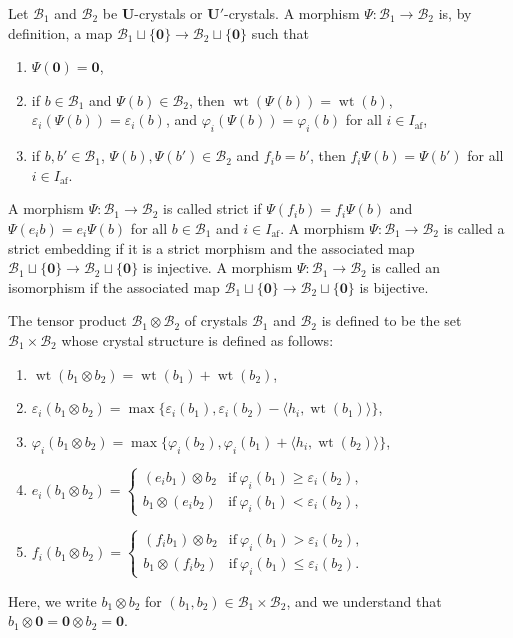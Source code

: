 \documentclass[ALCO,ThmDefs,Unicode,epreuves]{cedram}
\newcommand\bm[1]{\boldsymbol{#1}}
\renewcommand{\U}{\mathbf{U}}
\DeclareMathOperator{\af}{af}
\DeclareMathOperator{\wt}{wt}
\begin{document}
Let 
$\mathcal{B}_1$
and 
$\mathcal{B}_2$
be $\U$-crystals or $\U'$-crystals.
A morphism 
$\Psi : \mathcal{B}_1 \rightarrow \mathcal{B}_2$
is, by definition, a map
$\mathcal{B}_1 \sqcup \{ \bm{0} \} \rightarrow \mathcal{B}_2 \sqcup \{ \bm{0} \}$
such that 
\begin{enumerate}[label=(M\arabic*)]
\item
$\Psi (\bm{0}) = \bm{0}$, 
\item
if 
$b \in \mathcal{B}_1$ 
and 
$\Psi(b) \in \mathcal{B}_2$, 
then 
$\wt (\Psi(b)) = \wt (b)$, 
$\varepsilon_i (\Psi(b)) = \varepsilon_i (b)$, and
$\varphi_i(\Psi(b)) = \varphi_i(b)$ 
for all 
$i \in I_{\af}$, 
\item
if
$b , b' \in \mathcal{B}_1$, 
$\Psi(b) , \Psi(b') \in \mathcal{B}_2$ and 
$f_i b = b'$, 
then
$f_i \Psi(b) = \Psi(b')$
for all 
$i \in I_{\af}$. 
\end{enumerate}
A morphism
$\Psi : \mathcal{B}_1 \rightarrow \mathcal{B}_2$
is called strict if 
$\Psi(f_i b) = f_i \Psi (b)$
and 
$\Psi(e_i b) = e_i \Psi (b)$
for all 
$b \in \mathcal{B}_1$ and $i \in I_{\af}$.
A morphism
$\Psi : \mathcal{B}_1 \rightarrow \mathcal{B}_2$
is called a strict embedding if it is a strict morphism and the associated map 
$\mathcal{B}_1 \sqcup \{ \bm{0} \} \rightarrow \mathcal{B}_2 \sqcup \{ \bm{0} \}$
is injective. A morphism
$\Psi : \mathcal{B}_1 \rightarrow \mathcal{B}_2$
is called an isomorphism if the associated map 
$\mathcal{B}_1 \sqcup \{ \bm{0} \} \rightarrow \mathcal{B}_2 \sqcup \{ \bm{0} \}$
is bijective.

The tensor product
$\mathcal{B}_1 \otimes \mathcal{B}_2$ 
of crystals
$\mathcal{B}_1$
and 
$\mathcal{B}_2$ 
is defined to be the set 
$\mathcal{B}_1 \times \mathcal{B}_2$ 
whose crystal structure is defined as follows: 
\begin{enumerate}[label=(T\arabic*)]
\item
$\wt (b_1 \otimes b_2) = \wt (b_1) + \wt (b_2)$, 
\item
$\varepsilon_i (b_1 \otimes b_2) 
= 
\max \{ \varepsilon_i(b_1) , \varepsilon_i(b_2) - \langle h_i , \wt (b_1) \rangle \}$, 
\item
$\varphi_i (b_1 \otimes b_2) 
= 
\max \{ \varphi_i(b_2) , \varphi_i(b_1) + \langle h_i , \wt (b_2) \rangle \}$, 
\item
$e_i (b_1 \otimes b_2) 
=
\begin{cases}
(e_i b_1) \otimes b_2 
&\text{if} \ \varphi_i(b_1) \geq \varepsilon_i(b_2), \\
b_1 \otimes (e_i b_2) 
&\text{if} \ \varphi_i(b_1) < \varepsilon_i(b_2),
\end{cases}$
\item
$f_i (b_1 \otimes b_2) 
=
\begin{cases}
(f_i b_1) \otimes b_2 
&\text{if} \ \varphi_i(b_1) > \varepsilon_i(b_2), \\
b_1 \otimes (f_i b_2) 
&\text{if} \ \varphi_i(b_1) \leq \varepsilon_i(b_2).
\end{cases}$
\end{enumerate}
Here, we write 
$b_1 \otimes b_2$ 
for 
$(b_1 , b_2) \in \mathcal{B}_1 \times \mathcal{B}_2$, 
and we understand that
$b_1 \otimes \bm{0} = \bm{0} \otimes b_2 = \bm{0}$. 
\end{document}
